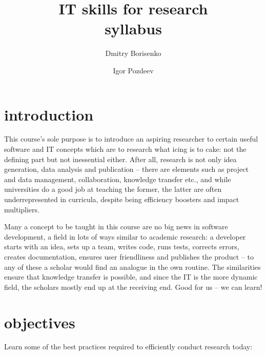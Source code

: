 \documentclass[12pt]{article}
\title{IT skills for research \\[24pt] \large syllabus}
\author{
    Dmitry Borisenko 
    \and
    Igor Pozdeev
}
\date{}
\begin{document}
\maketitle

\tableofcontents

\newpage

\section{introduction} %
\label{sec:introduction}

This course's sole purpose is to introduce an aspiring researcher to certain useful software and IT concepts which are to research what icing is to cake: not the defining part but not inessential either. After all, research is not only idea generation, data analysis and publication -- there are elements such as project and data management, collaboration, knowledge transfer etc., and while universities do a good job at teaching the former, the latter are often underrepresented in curricula, despite being efficiency boosters and impact multipliers.

Many a concept to be taught in this course are no big news in software development, a field in lots of ways similar to academic research: a developer starts with an idea, sets up a team, writes code, runs tests, corrects errors, creates documentation, ensures user friendliness and publishes the product -- to any of these a scholar would find an analogue in the own routine. The similarities ensure that knowledge transfer is possible, and since the IT is the more dynamic field, the scholars mostly end up at the receiving end. Good for us -- we can learn!


\section{objectives} %
\label{sec:objectives}

Learn some of the best practices required to efficiently conduct research today:
\end{document}
